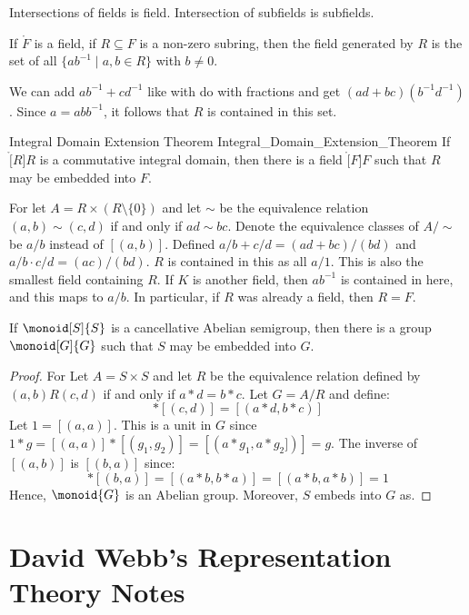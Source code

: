            Intersections of fields is field. Intersection of subfields is
            subfields.
            \begin{theorem}
                If $\ring{F}$ is a field, if $R\subseteq{F}$ is a non-zero
                subring, then the field generated by $R$ is the set of all
                $\{ab^{\minus{1}}\;|\;a,b\in{R}\}$ with $b\ne{0}$.
            \end{theorem}
            We can add $ab^{\minus{1}}+cd^{\minus{1}}$ like with do with
            fractions and get $(ad+bc)(b^{\minus{1}}d^{\minus{1}})$.
            Since $a=abb^{\minus{1}}$, it follows that $R$ is contained in
            this set.
            \begin{ftheorem}{Integral Domain Extension Theorem}
                            {Integral_Domain_Extension_Theorem}
                If $\ring[R]{R}$ is a commutative integral domain, then
                there is a field $\ring[F]{F}$ such that $R$ may be
                embedded into $F$.
            \end{ftheorem}
            \begin{bproof}
                For let $A=R\times(R\setminus\{0\})$ and let $\sim$ be the
                equivalence relation $(a,b)\sim(c,d)$ if and only if
                $ad\sim{b}c$. Denote the equivalence classes of
                $A/\sim$ be $a/b$ instead of $[(a,b)]$. Defined
                $a/b+c/d=(ad+bc)/(bd)$ and $a/b\cdot{c}/d=(ac)/(bd)$.
                $R$ is contained in this as all $a/1$. This is also the
                smallest field containing $R$. If $K$ is another field,
                then $ab^{\minus{1}}$ is contained in here, and this maps
                to $a/b$. In particular, if $R$ was already a field, then
                $R=F$.
            \end{bproof}
            \begin{theorem}
                If $\monoid[S]{S}$ is a cancellative Abelian semigroup, then
                there is a group $\monoid[G]{G}$ such that $S$ may be
                embedded into $G$.
            \end{theorem}
            \begin{proof}
                For Let $A=S\times{S}$ and let $R$ be the equivalence
                relation defined by $(a,b)R(c,d)$ if and only if
                $a*d=b*c$. Let $G=A/R$ and define:
                \begin{equation}
                    [(a,b)]*[(c,d)]=[(a*d,b*c)]
                \end{equation}
                Let $1=[(a,a)]$. This is a unit in $G$ since
                $1*g=[(a,a)]*[(g_{1},g_{2})]=[(a*g_{1},a*g_{2}])]=g$.
                The inverse of $[(a,b)]$ is $[(b,a)]$ since:
                \begin{equation}
                    [(a,b)]*[(b,a)]=[(a*b,b*a)]=[(a*b,a*b)]=1
                \end{equation}
                Hence, $\monoid{G}$ is an Abelian group. Moreover, $S$
                embeds into $G$ as.
            \end{proof}
\section{David Webb's Representation Theory Notes}